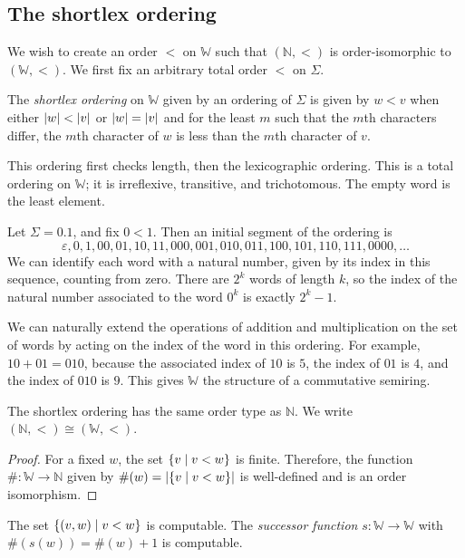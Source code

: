 \subsection{The shortlex ordering}
We wish to create an order \( < \) on \( \mathbb W \) such that \( (\mathbb N, <) \) is order-isomorphic to \( (\mathbb W, <) \).
We first fix an arbitrary total order \( < \) on \( \Sigma \).
\begin{definition}
	The \emph{shortlex ordering} on \( \mathbb W \) given by an ordering of \( \Sigma \) is given by \( w < v \) when either \( \abs{w} < \abs{v} \) or \( \abs{w} = \abs{v} \) and for the least \( m \) such that the \( m \)th characters differ, the \( m \)th character of \( w \) is less than the \( m \)th character of \( v \).
\end{definition}
This ordering first checks length, then the lexicographic ordering.
This is a total ordering on \( \mathbb W \); it is irreflexive, transitive, and trichotomous.
The empty word is the least element.
\begin{example}
	Let \( \Sigma = \qty{0,1} \), and fix \( 0 < 1 \).
	Then an initial segment of the ordering is
	\[ \varepsilon, 0, 1, 00, 01, 10, 11, 000, 001, 010, 011, 100, 101, 110, 111, 0000, \dots \]
	We can identify each word with a natural number, given by its index in this sequence, counting from zero.
	There are \( 2^k \) words of length \( k \), so the index of the natural number associated to the word \( 0^k \) is exactly \( 2^k - 1 \).

	We can naturally extend the operations of addition and multiplication on the set of words by acting on the index of the word in this ordering.
	For example, \( 10 + 01 = 010 \), because the associated index of \( 10 \) is \( 5 \), the index of \( 01 \) is \( 4 \), and the index of \( 010 \) is \( 9 \).
	This gives \( \mathbb W \) the structure of a commutative semiring.
\end{example}
\begin{theorem}
	The shortlex ordering has the same order type as \( \mathbb N \).
	We write \( (\mathbb N, <) \cong (\mathbb W, <) \).
\end{theorem}
\begin{proof}
	For a fixed \( w \), the set \( \qty{v \mid v < w} \) is finite.
	Therefore, the function \( \# \colon \mathbb W \to \mathbb N \) given by \( \#(w) = \abs{\qty{v \mid v < w}} \) is well-defined and is an order isomorphism.
\end{proof}
\begin{theorem}
	The set \( \qty{(v,w) \mid v < w} \) is computable.
	The \emph{successor function} \( s \colon \mathbb W \to \mathbb W \) with \( \#(s(w)) = \#(w)+1 \) is computable.
\end{theorem}
